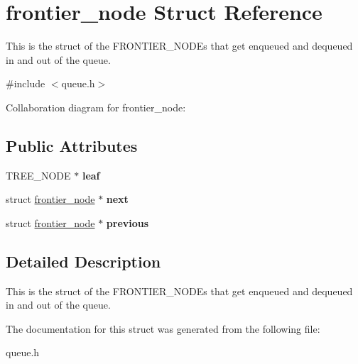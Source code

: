 \hypertarget{structfrontier__node}{}\section{frontier\+\_\+node Struct Reference}
\label{structfrontier__node}


This is the struct of the F\+R\+O\+N\+T\+I\+E\+R\+\_\+\+N\+O\+D\+Es that get enqueued and dequeued in and out of the queue.  




{\ttfamily \#include $<$queue.\+h$>$}



Collaboration diagram for frontier\+\_\+node\+:
\subsection*{Public Attributes}
\begin{DoxyCompactItemize}
\item 
\mbox{\label{structfrontier__node_a82170fd5da68bd67bfb5f0040ecb9de0}} 
T\+R\+E\+E\+\_\+\+N\+O\+DE $\ast$ {\bfseries leaf}
\item 
\mbox{\label{structfrontier__node_add5ba9e88e589d9673b40748df5bdfb9}} 
struct \hyperlink{structfrontier__node}{frontier\+\_\+node} $\ast$ {\bfseries next}
\item 
\mbox{\label{structfrontier__node_a219bf99227fcc0825051f21abf65ad8f}} 
struct \hyperlink{structfrontier__node}{frontier\+\_\+node} $\ast$ {\bfseries previous}
\end{DoxyCompactItemize}


\subsection{Detailed Description}
This is the struct of the F\+R\+O\+N\+T\+I\+E\+R\+\_\+\+N\+O\+D\+Es that get enqueued and dequeued in and out of the queue. 

The documentation for this struct was generated from the following file\+:\begin{DoxyCompactItemize}
\item 
queue.\+h\end{DoxyCompactItemize}
